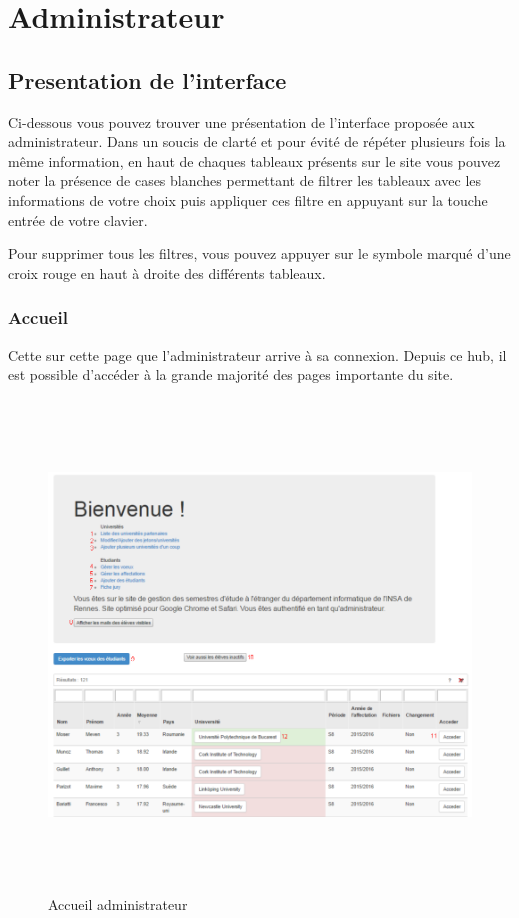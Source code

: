 \chapter{Administrateur}
\label{admin}

\section{Presentation de l'interface}
Ci-dessous vous pouvez trouver une présentation de l'interface proposée aux administrateur. Dans un soucis de clarté et pour évité de répéter plusieurs fois la même information, en haut de chaques tableaux présents sur le site vous pouvez noter la présence de cases blanches permettant de filtrer les tableaux avec les informations de votre choix puis appliquer ces filtre en appuyant sur la touche entrée de votre clavier.

Pour supprimer tous les filtres, vous pouvez appuyer sur le symbole marqué d'une croix rouge en haut à droite des différents tableaux.

 
\subsection{Accueil}
\label{aa}
Cette sur cette page que l'administrateur arrive à sa connexion. Depuis ce hub, il est possible d'accéder à la grande majorité des pages importante du site.
 \begin{figure}[H]
 	\centering
 	
 	\includegraphics[width=16cm,height=13cm]{Images/Admin/menu_acceuil_admin.png}
 	\caption{Accueil administrateur}
 	
 \end{figure}
 
